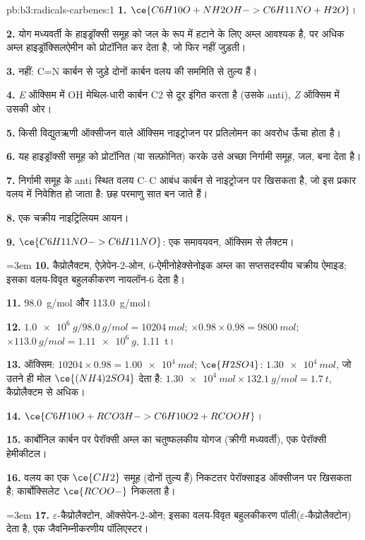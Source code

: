\begin{solution}{pb:b3:radicals-carbenes:1}
\textbf{1.} $\ce{C6H10O + NH2OH -> C6H11NO + H2O}$।

\textbf{2.} योग मध्यवर्ती के हाइड्रॉक्सी समूह को जल के रूप में हटाने के लिए अम्ल
आवश्यक है, पर अधिक अम्ल हाइड्रॉक्सिलऐमीन को प्रोटॉनित कर देता है, जो फिर नहीं जुड़ती।

\textbf{3.} नहीं: C=N कार्बन से जुड़े दोनों कार्बन वलय की सममिति से
तुल्य हैं।

\textbf{4.} \textit{E} ऑक्सिम में OH मेथिल-धारी कार्बन C2 से दूर इंगित करता है (उसके
anti), \textit{Z} ऑक्सिम में उसकी ओर।

\textbf{5.} किसी विद्युतऋणी ऑक्सीजन वाले ऑक्सिम नाइट्रोजन पर प्रतिलोमन का अवरोध
ऊँचा होता है।

\textbf{6.} यह हाइड्रॉक्सी समूह को प्रोटॉनित (या सल्फ़ोनित) करके उसे अच्छा निर्गामी
समूह, जल, बना देता है।

\textbf{7.} निर्गामी समूह के anti स्थित वलय C--C आबंध कार्बन से नाइट्रोजन पर खिसकता है,
जो इस प्रकार वलय में निवेशित हो जाता है: छह परमाणु सात बन जाते हैं।

\textbf{8.} एक चक्रीय नाइट्रिलियम आयन।

\textbf{9.} $\ce{C6H11NO -> C6H11NO}$: एक समावयवन, ऑक्सिम से लैक्टम।

\emergencystretch=3em \textbf{10.} कैप्रोलैक्टम, ऐज़ेपेन-2-ओन, 6-ऐमीनोहेक्सेनोइक अम्ल का सप्तसदस्यीय चक्रीय
ऐमाइड; इसका वलय-विवृत बहुलकीकरण नायलॉन-6 देता है।

\textbf{11.} \qty{98.0}{g/mol} और \qty{113.0}{g/mol}।

\textbf{12.} $\qty{1.0e6}{g}/\qty{98.0}{g/mol} = \qty{10204}{mol}$; $\times 0.98 \times 0.98 = \qty{9800}{mol}$; $\times \qty{113.0}{g/mol} = \qty{1.11e6}{g}$, \qty{1.11}{t}।

\textbf{13.} ऑक्सिम: $\num{10204} \times 0.98 = \qty{1.00e4}{mol}$; $\ce{H2SO4}$: $\qty{1.30e4}{mol}$, जो उतने ही मोल
$\ce{(NH4)2SO4}$ देता है: $\qty{1.30e4}{mol} \times \qty{132.1}{g/mol} = \qty{1.7}{t}$, कैप्रोलैक्टम से अधिक।

\textbf{14.} $\ce{C6H10O + RCO3H -> C6H10O2 + RCOOH}$।

\textbf{15.} कार्बोनिल कार्बन पर पेरॉक्सी अम्ल का चतुष्फलकीय योगज (क्रीगी
मध्यवर्ती), एक पेरॉक्सी हेमीकीटल।

\textbf{16.} वलय का एक $\ce{CH2}$ समूह (दोनों तुल्य हैं) निकटतर पेरॉक्साइड
ऑक्सीजन पर खिसकता है; कार्बोक्सिलेट $\ce{RCOO-}$ निकलता है।

\emergencystretch=3em \textbf{17.} $\varepsilon$-कैप्रोलैक्टोन, ऑक्सेपेन-2-ओन; इसका वलय-विवृत बहुलकीकरण
पॉली($\varepsilon$-कैप्रोलैक्टोन) देता है, एक जैवनिम्नीकरणीय पॉलिएस्टर।


\end{solution}
